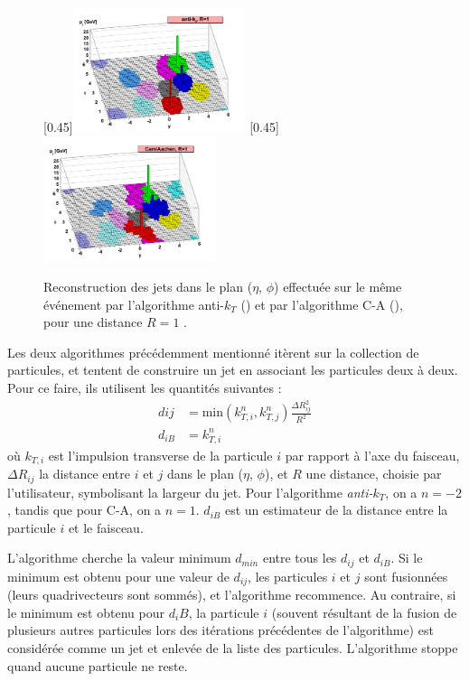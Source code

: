 \medskip

\begin{figure}[tbp]
    \centering
    \subcaptionbox{\label{fig:jets_akt}}[0.45\textwidth]{\includegraphics[width=0.45\textwidth]{chapitre3/figs/jets_akt.png}} \hfill
    \subcaptionbox{\label{fig:jets_ca}}[0.45\textwidth]{\includegraphics[width=0.45\textwidth]{chapitre3/figs/jets_ca.png}}
    \caption{Reconstruction des jets dans le plan ($\eta$, $\phi$) effectuée sur le même événement par l'algorithme anti-$k_T$ () et par l'algorithme C-A (), pour une distance $R = 1$ \citep{antikt}.}
    \label{fig:akt_ca}
\end{figure}

Les deux algorithmes précédemment mentionné itèrent sur la collection de particules, et tentent de construire un jet en associant les particules deux à deux. Pour ce faire, ils utilisent les quantités suivantes :
\begin{align*}
  d{ij} &= \text{min}\left( k_{T, i}^n, k_{T, j}^n \right) \frac{\Delta R^2_{ij}}{R^2} \\
  d_{iB} &= k^n_{T, i}
\end{align*}
où $k_{T, i}$ est l'impulsion transverse de la particule $i$ par rapport à l'axe du faisceau, $\Delta R_{ij}$ la distance entre $i$ et $j$ dans le plan ($\eta$, $\phi$), et $R$ une distance, choisie par l'utilisateur, symbolisant la largeur du jet. Pour l'algorithme \emph{anti-$k_T$}, on a $n = -2$, tandis que pour C-A, on a $n = 1$. $d_{iB}$ est un estimateur de la distance entre la particule $i$ et le faisceau.

L'algorithme cherche la valeur minimum $d_{min}$ entre tous les $d_{ij}$ et $d_{iB}$. Si le minimum est obtenu pour une valeur de $d_{ij}$, les particules $i$ et $j$ sont fusionnées (leurs quadrivecteurs sont sommés), et l'algorithme recommence. Au contraire, si le minimum est obtenu pour $d_iB$, la particule $i$ (souvent résultant de la fusion de plusieurs autres particules lors des itérations précédentes de l'algorithme) est considérée comme un jet et enlevée de la liste des particules. L'algorithme stoppe quand aucune particule ne reste.

